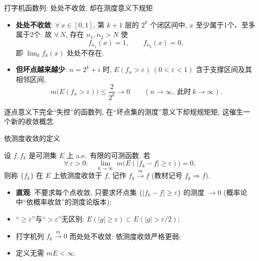 \begin{frame}{打字机函数列: 处处不收敛, 却在测度意义下规矩}

\begin{itemize}
\item \textbf{处处不收敛}: $\forall\, x \in [0,1]$, 第 $k+1$ 层的 $2^k$ 个闭区间中, $x$ 至少属于\alert{1}个、至多属于\alert{2}个. 故 $\forall\, N$, 存在 $n_1, n_2 > N$ 使
\[
f_{n_1}(x) = 1, \qquad f_{n_2}(x) = 0,
\]
即 $\lim_k f_k(x)$ \alert{处处不存在}.
\end{itemize}

\pause

\begin{itemize}
\item \textbf{但坏点越来越少}: $n = 2^k + i$ 时, $E(f_n > \varepsilon)\ (0 < \varepsilon < 1)$ 含于支撑区间及其相邻区间,
\[
m\big(E(f_n > \varepsilon)\big) \leqslant \frac{2}{2^k} \longrightarrow 0
\qquad (n \to \infty,\ \text{此时}\ k \to \infty).
\]
\end{itemize}

\pause

\begin{question}
逐点意义下完全``失控''的函数列, 在``坏点集的\alert{测度}''意义下却规规矩矩, 这催生一个新的收敛概念.
\end{question}

\end{frame}


\begin{frame}{依测度收敛的定义}

\begin{Def}[依测度收敛]
设 $f, f_k$ 是可测集 $E$ 上 a.e.\ 有限的可测函数. 若
\[
\forall\, \varepsilon > 0:\quad
\lim_{k\to\infty}\ m\big(E(|f_k - f| \geqslant \varepsilon)\big) = 0,
\]
则称 $\{f_k\}$ 在 $E$ 上\alert{依测度收敛}于 $f$, 记作 $f_k \xrightarrow{m} f$ (教材记号 $f_k \Rightarrow f$).
\end{Def}

\pause

\begin{itemize}
\item \textbf{直观}: 不要求每个点收敛, 只要求\alert{坏点集} $\{|f_k - f| \geqslant \varepsilon\}$ 的\alert{测度} $\to 0$ (概率论中``依概率收敛''的测度论版本);
\item ``$\geqslant \varepsilon$''与``$> \varepsilon$''无区别: $E(|g| \geqslant \varepsilon) \subset E(|g| > \varepsilon/2)$;
\item 打字机列 $f_k \xrightarrow{m} 0$ 而处处不收敛: 依测度收敛\alert{严格更弱};
\item 定义\alert{无需} $mE < \infty$.
\end{itemize}

\end{frame}

